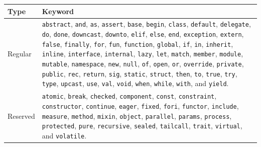 \documentclass[fsharpnotes.tex]{subfiles}
\begin{document}
\begin{table}
  \centering
  \begin{tabularx}{\textwidth}{|l|>{\raggedright\arraybackslash}X|}
    \hline
    \rowcolor{headerRowColor} Type & Keyword\\
    \hline
  Regular 
  &\mbox{\lstinline{abstract},} \mbox{\lstinline{and},} \mbox{\lstinline{as},} \mbox{\lstinline{assert},} \mbox{\lstinline{base},} \mbox{\lstinline{begin},} \mbox{\lstinline{class},} \mbox{\lstinline{default},} \mbox{\lstinline{delegate},} \mbox{\lstinline{do},} \mbox{\lstinline{done},} \mbox{\lstinline{downcast},} \mbox{\lstinline{downto},} \mbox{\lstinline{elif},} \mbox{\lstinline{else},} \mbox{\lstinline{end},} \mbox{\lstinline{exception},} \mbox{\lstinline{extern},} \mbox{\lstinline{false},} \mbox{\lstinline{finally},} \mbox{\lstinline{for},} \mbox{\lstinline{fun},} \mbox{\lstinline{function},} \mbox{\lstinline{global},} \mbox{\lstinline{if},} \mbox{\lstinline{in},} \mbox{\lstinline{inherit},} \mbox{\lstinline{inline},} \mbox{\lstinline{interface},} \mbox{\lstinline{internal},} \mbox{\lstinline{lazy},} \mbox{\lstinline{let},} \mbox{\lstinline{match},} \mbox{\lstinline{member},} \mbox{\lstinline{module},} \mbox{\lstinline{mutable},} \mbox{\lstinline{namespace},} \mbox{\lstinline{new},} \mbox{\lstinline{null},} \mbox{\lstinline{of},} \mbox{\lstinline{open},} \mbox{\lstinline{or},} \mbox{\lstinline{override},} \mbox{\lstinline{private},} \mbox{\lstinline{public},} \mbox{\lstinline{rec},} \mbox{\lstinline{return},} \mbox{\lstinline{sig},} \mbox{\lstinline{static},} \mbox{\lstinline{struct},} \mbox{\lstinline{then},} \mbox{\lstinline{to},} \mbox{\lstinline{true},} \mbox{\lstinline{try},} \mbox{\lstinline{type},} \mbox{\lstinline{upcast},} \mbox{\lstinline{use},} \mbox{\lstinline{val},} \mbox{\lstinline{void},} \mbox{\lstinline{when},} \mbox{\lstinline{while},} \mbox{\lstinline{with},} and \mbox{\lstinline{yield}.}\\
 Reserved
 & \mbox{\lstinline{atomic},} \mbox{\lstinline{break},} \mbox{\lstinline{checked},} \mbox{\lstinline{component},} \mbox{\lstinline{const},} \mbox{\lstinline{constraint},} \mbox{\lstinline{constructor},} \mbox{\lstinline{continue},} \mbox{\lstinline{eager},} \mbox{\lstinline{fixed},} \mbox{\lstinline{fori},} \mbox{\lstinline{functor},} \mbox{\lstinline{include},} \mbox{\lstinline{measure},} \mbox{\lstinline{method},} \mbox{\lstinline{mixin},} \mbox{\lstinline{object},} \mbox{\lstinline{parallel},} \mbox{\lstinline{params},} \mbox{\lstinline{process},} \mbox{\lstinline{protected},} \mbox{\lstinline{pure},} \mbox{\lstinline{recursive},} \mbox{\lstinline{sealed},} \mbox{\lstinline{tailcall},} \mbox{\lstinline{trait},} \mbox{\lstinline{virtual},} and \mbox{\lstinline{volatile}.}\\

\end{tabularx}
\end{table}
\end{document}
